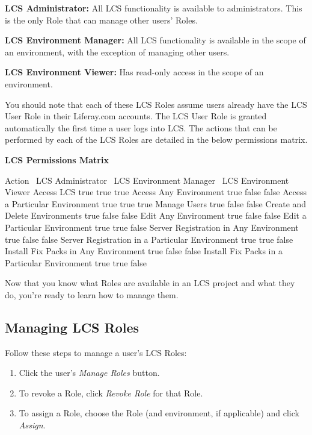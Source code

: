 \textbf{LCS Administrator:} All LCS functionality is available to
administrators. This is the only Role that can manage other users'
Roles.

\textbf{LCS Environment Manager:} All LCS functionality is available in
the scope of an environment, with the exception of managing other users.

\textbf{LCS Environment Viewer:} Has read-only access in the scope of an
environment.

You should note that each of these LCS Roles assume users already have
the LCS User Role in their Liferay.com accounts. The LCS User Role is
granted automatically the first time a user logs into LCS. The actions
that can be performed by each of the LCS Roles are detailed in the below
permissions matrix.

\textbf{LCS Permissions Matrix}

Action \textbar{} ~LCS Administrator \textbar{} ~LCS Environment Manager
\textbar{} ~LCS Environment Viewer \textbar{} Access LCS \textbar{} true
\textbar{} true \textbar{} true \textbar{} Access Any Environment
\textbar{} true \textbar{} false \textbar{} false \textbar{} Access a
Particular Environment \textbar{} true \textbar{} true \textbar{} true
\textbar{} Manage Users \textbar{} true \textbar{} false \textbar{}
false \textbar{} Create and Delete Environments \textbar{} true
\textbar{} false \textbar{} false \textbar{} Edit Any Environment
\textbar{} true \textbar{} false \textbar{} false \textbar{} Edit a
Particular Environment \textbar{} true \textbar{} true \textbar{} false
\textbar{} Server Registration in Any Environment \textbar{} true
\textbar{} false \textbar{} false \textbar{} Server Registration in a
Particular Environment \textbar{} true \textbar{} true \textbar{} false
\textbar{} Install Fix Packs in Any Environment \textbar{} true
\textbar{} false \textbar{} false \textbar{} Install Fix Packs in a
Particular Environment \textbar{} true \textbar{} true \textbar{} false
\textbar{}

Now that you know what Roles are available in an LCS project and what
they do, you're ready to learn how to manage them.

\subsection{Managing LCS Roles}\label{managing-lcs-roles}

Follow these steps to manage a user's LCS Roles:

\begin{enumerate}
\def\labelenumi{\arabic{enumi}.}
\item
  Click the user's \emph{Manage Roles} button.
\item
  To revoke a Role, click \emph{Revoke Role} for that Role.
\item
  To assign a Role, choose the Role (and environment, if applicable) and
  click \emph{Assign}.
\end{enumerate}

